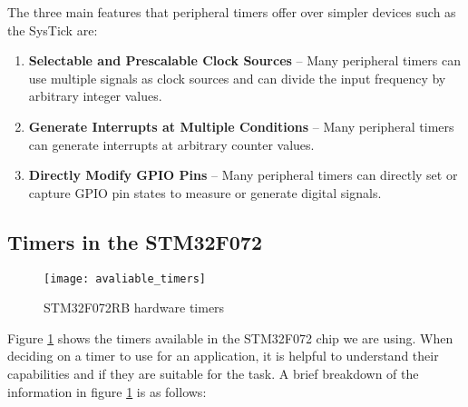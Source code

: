 \documentclass[11pt,fleqn]{book} %
\begin{document}
        The three main features that peripheral timers offer over simpler devices such as the SysTick are:
        \begin{enumerate}
            \item \textbf{Selectable and Prescalable Clock Sources} -- Many peripheral timers can use multiple signals as clock sources and can divide the input frequency by arbitrary integer values. 
            \item \textbf{Generate Interrupts at Multiple Conditions} -- Many peripheral timers can generate interrupts at arbitrary counter values.
            \item \textbf{Directly Modify GPIO Pins} -- Many peripheral timers can directly set or capture GPIO pin states to measure or generate digital signals.  
        \end{enumerate}
        
	
    
    \subsection{Timers in the STM32F072}
        \begin{figure}[]
            \centering\texttt{[image: avaliable\_timers]}
            \caption{STM32F072RB hardware timers}
            \label{avaliable_timers}
        \end{figure}
        
        
        Figure \ref{avaliable_timers} shows the timers available in the STM32F072 chip we are using. When deciding on a timer to use for an application, it is helpful to understand their capabilities and if they are suitable for the task. A brief breakdown of the information in figure \ref{avaliable_timers} is as follows:
        
\end{document}
